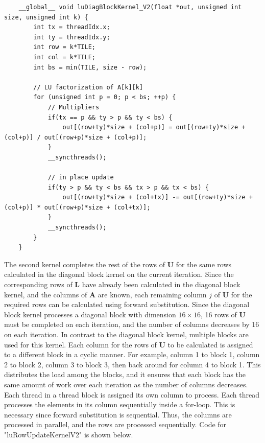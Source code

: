 \documentclass{article}
\begin{document}
\begin{verbatim}
	__global__ void luDiagBlockKernel_V2(float *out, unsigned int size, unsigned int k) {
		int tx = threadIdx.x;
		int ty = threadIdx.y;
		int row = k*TILE;
		int col = k*TILE;
		int bs = min(TILE, size - row);
		
		// LU factorization of A[k][k]
		for (unsigned int p = 0; p < bs; ++p) {
			// Multipliers
			if(tx == p && ty > p && ty < bs) {
				out[(row+ty)*size + (col+p)] = out[(row+ty)*size + (col+p)] / out[(row+p)*size + (col+p)];
			}
			__syncthreads();
			
			// in place update
			if(ty > p && ty < bs && tx > p && tx < bs) {
				out[(row+ty)*size + (col+tx)] -= out[(row+ty)*size + (col+p)] * out[(row+p)*size + (col+tx)];
			}
			__syncthreads();
		}
	}
\end{verbatim}

The second kernel completes the rest of the rows of $\mathbf{U}$ for the same rows calculated in the diagonal block kernel on the current iteration. Since the corresponding rows of $\mathbf{L}$ have already been calculated in the diagonal block kernel, and the columns of $\mathbf{A}$ are known, each remaining column $j$ of $\mathbf{U}$ for the required rows can be calculated using forward substitution. Since the diagonal block kernel processes a diagonal block with dimension $16\times 16$, 16 rows of $\mathbf{U}$ must be completed on each iteration, and the number of columns decreases by 16 on each iteration. In contrast to the diagonal block kernel, multiple blocks are used for this kernel. Each column for the rows of $\mathbf{U}$ to be calculated is assigned to a different block in a cyclic manner. For example, column 1 to block 1, column 2 to block 2, column 3 to block 3, then back around for column 4 to block 1. This distributes the load among the blocks, and it ensures that each block has the same amount of work over each iteration as the number of columns decreases. Each thread in a thread block is assigned its own column to process. Each thread processes the elements in its column sequentially inside a for-loop. This is necessary since forward substitution is sequential. Thus, the columns are processed in parallel, and the rows are processed sequentially. Code for "luRowUpdateKernel\textunderscore V2" is shown below.
\end{document}
